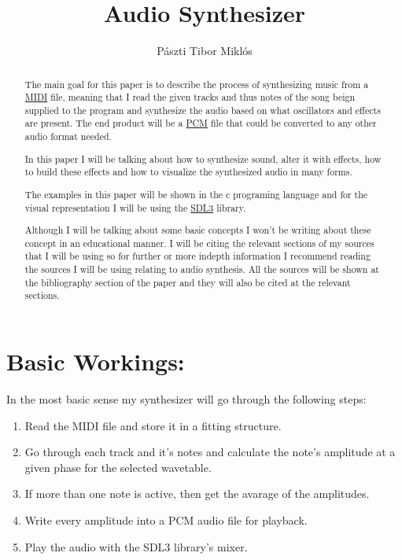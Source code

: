 \documentclass{article}
\title{Audio Synthesizer}
\author{Pászti Tibor Miklós}
\begin{document}
\maketitle

\begin{abstract}
    The main goal for this paper is to describe the process of synthesizing
    music from a 
    \href{https://midi.org/}{MIDI}
    file, meaning that I read the given tracks and thus notes
    of the song beign supplied to the program and synthesize the audio based 
    on what oscillators and effects are present. The end product will be a 
    \href{https://en.wikipedia.org/wiki/Pulse-code_modulation}{PCM}
    file that could be converted to any other audio format needed.

    In this paper I will be talking about how to synthesize sound, alter 
    it with effects, how to build these effects and how to visualize the 
    synthesized audio in many forms.

    The examples in this paper will be shown in the c programing language
    and for the visual representation I will be using the 
    \href{https://wiki.libsdl.org/SDL3/FrontPage}{SDL3}
    library.

    Although I will be talking about some basic concepts I won't be 
    writing about these concept in an educational manner. I will be 
    citing the relevant sections of my sources that I will be using
    so for further or more indepth information I recommend reading
    the sources I will be using relating to audio synthesis.
    All the sources will be shown at the bibliography section of 
    the paper and they will also be cited at the relevant sections.
\end{abstract}

\tableofcontents
\pagebreak

\section{Basic Workings:}
In the most basic sense my synthesizer will go through the following steps:

\begin{enumerate}
    \item Read the MIDI file and store it in a fitting structure.
    \item Go through each track and it's notes and calculate the note's 
        amplitude at a given phase for the selected wavetable.
    \item If more than one note is active, then get the avarage of the amplitudes.
    \item Write every amplitude into a PCM audio file for playback.
    \item Play the audio with the SDL3 library's mixer.
\end{enumerate}
\end{document}
